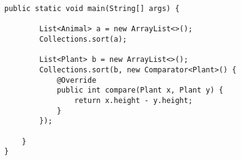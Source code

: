 \begin{lstlisting}[basicstyle=\small,]
    public static void main(String[] args) {

        List<Animal> a = new ArrayList<>();
        Collections.sort(a);

        List<Plant> b = new ArrayList<>();
        Collections.sort(b, new Comparator<Plant>() {
            @Override
            public int compare(Plant x, Plant y) {
                return x.height - y.height;
            }
        });

    }
}


\end{lstlisting}
 


